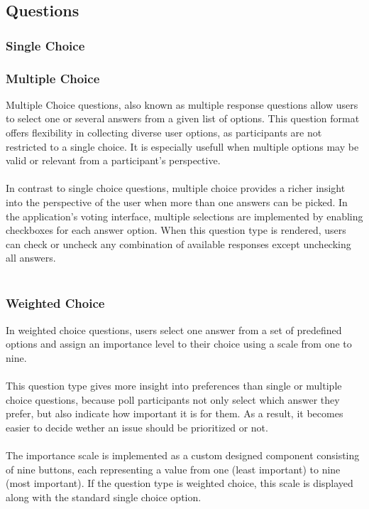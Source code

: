 \documentclass[a4paper,12pt]{report}
\begin{document}
\subsection{Questions}
\subsubsection{Single Choice}
\subsubsection{Multiple Choice}
Multiple Choice questions, also known as multiple response questions allow users to select one or several answers from a given list of options. This question format offers flexibility in collecting diverse user options, as participants are not restricted to a single choice. It is especially usefull when multiple options may be valid or relevant from a participant's perspective.\\\\
In contrast to single choice questions, multiple choice provides a richer insight into the perspective of the user when more than one answers can be picked. In the application's voting interface, multiple selections are implemented by enabling checkboxes for each answer option. When this question type is rendered, users can check or uncheck any combination of available responses except unchecking all answers.\\\\
\subsubsection{Weighted Choice}
In weighted choice questions, users select one answer from a set of predefined options and assign an importance level to their choice using a scale from one to nine.\\\\
This question type gives more insight into preferences than single or multiple choice questions, because poll participants not only select which answer they prefer, but also indicate how important it is for them. As a result, it becomes easier to decide wether an issue should be prioritized or not.\\\\
The importance scale is implemented as a custom designed component consisting of nine buttons, each representing a value from one (least important) to nine (most important). If the question type is weighted choice, this scale is displayed along with the standard single choice option.\\\\
\end{document}
